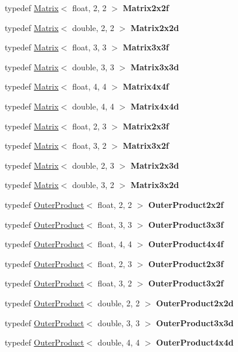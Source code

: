 \begin{DoxyCompactItemize}
\item 
typedef \hyperlink{structcugar_1_1_matrix}{Matrix}$<$ float, 2, 2 $>$ {\bfseries Matrix2x2f}
\item 
typedef \hyperlink{structcugar_1_1_matrix}{Matrix}$<$ double, 2, 2 $>$ {\bfseries Matrix2x2d}
\item 
typedef \hyperlink{structcugar_1_1_matrix}{Matrix}$<$ float, 3, 3 $>$ {\bfseries Matrix3x3f}
\item 
typedef \hyperlink{structcugar_1_1_matrix}{Matrix}$<$ double, 3, 3 $>$ {\bfseries Matrix3x3d}
\item 
typedef \hyperlink{structcugar_1_1_matrix}{Matrix}$<$ float, 4, 4 $>$ {\bfseries Matrix4x4f}
\item 
typedef \hyperlink{structcugar_1_1_matrix}{Matrix}$<$ double, 4, 4 $>$ {\bfseries Matrix4x4d}
\item 
typedef \hyperlink{structcugar_1_1_matrix}{Matrix}$<$ float, 2, 3 $>$ {\bfseries Matrix2x3f}
\item 
typedef \hyperlink{structcugar_1_1_matrix}{Matrix}$<$ float, 3, 2 $>$ {\bfseries Matrix3x2f}
\item 
typedef \hyperlink{structcugar_1_1_matrix}{Matrix}$<$ double, 2, 3 $>$ {\bfseries Matrix2x3d}
\item 
typedef \hyperlink{structcugar_1_1_matrix}{Matrix}$<$ double, 3, 2 $>$ {\bfseries Matrix3x2d}
\item 
typedef \hyperlink{structcugar_1_1_outer_product}{Outer\+Product}$<$ float, 2, 2 $>$ {\bfseries Outer\+Product2x2f}
\item 
typedef \hyperlink{structcugar_1_1_outer_product}{Outer\+Product}$<$ float, 3, 3 $>$ {\bfseries Outer\+Product3x3f}
\item 
typedef \hyperlink{structcugar_1_1_outer_product}{Outer\+Product}$<$ float, 4, 4 $>$ {\bfseries Outer\+Product4x4f}
\item 
typedef \hyperlink{structcugar_1_1_outer_product}{Outer\+Product}$<$ float, 2, 3 $>$ {\bfseries Outer\+Product2x3f}
\item 
typedef \hyperlink{structcugar_1_1_outer_product}{Outer\+Product}$<$ float, 3, 2 $>$ {\bfseries Outer\+Product3x2f}
\item 
typedef \hyperlink{structcugar_1_1_outer_product}{Outer\+Product}$<$ double, 2, 2 $>$ {\bfseries Outer\+Product2x2d}
\item 
typedef \hyperlink{structcugar_1_1_outer_product}{Outer\+Product}$<$ double, 3, 3 $>$ {\bfseries Outer\+Product3x3d}
\item 
typedef \hyperlink{structcugar_1_1_outer_product}{Outer\+Product}$<$ double, 4, 4 $>$ {\bfseries Outer\+Product4x4d}

\end{DoxyCompactItemize}
